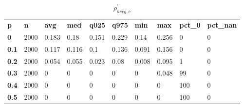 \begin{table}[h]
 \centering 
\footnotesize
\caption{$\rho_{hscg,c}^\prime $}
\label{tab:alphahscgc}
\begin{tabular}[h]{| l l l l l l l l l l|
    } \hline
\textbf{ p} & \textbf{ n} & \textbf{ avg} & \textbf{ med} & \textbf{ q025} & \textbf{ q975} & \textbf{ min} & \textbf{ max} & \textbf{ pct\_0} & \textbf{ pct\_nan}
           \\
  \textbf{  0} & 2000 & 0.183 &  0.18 & 0.151 & 0.229 &  0.14 & 0.256 &   0 & 0
           \\
  \textbf{0.1} & 2000 & 0.117 & 0.116 &   0.1 & 0.136 & 0.091 & 0.156 &   0 & 0
           \\
  \textbf{0.2} & 2000 & 0.054 & 0.055 & 0.023 &  0.08 & 0.008 & 0.095 &   1 & 0
           \\
  \textbf{0.3} & 2000 &     0 &     0 &     0 &     0 &     0 & 0.048 &  99 & 0
           \\
  \textbf{0.4} & 2000 &     0 &     0 &     0 &     0 &     0 &     0 & 100 & 0
           \\
  \textbf{0.5} & 2000 &     0 &     0 &     0 &     0 &     0 &     0 & 100 & 0
           \\
 \hline \end{tabular}
 \end{table}
